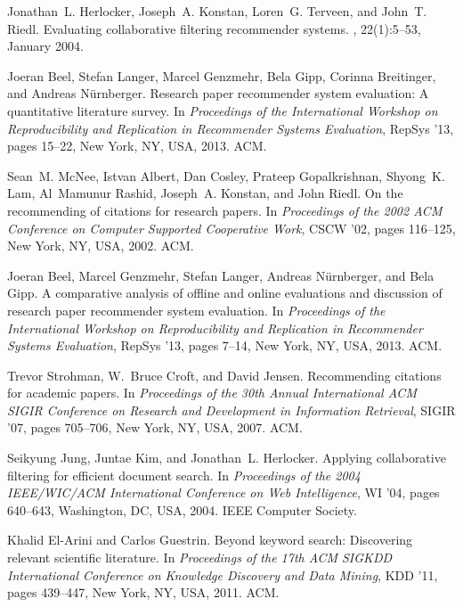 \documentclass[journal]{IEEEtran}
\begin{document}
\begin{thebibliography}{1}
Jonathan~L. Herlocker, Joseph~A. Konstan, Loren~G. Terveen, and John~T. Riedl.
\newblock Evaluating collaborative filtering recommender systems.
, 22(1):5--53, January 2004.

Joeran Beel, Stefan Langer, Marcel Genzmehr, Bela Gipp, Corinna Breitinger, and
  Andreas N\"{u}rnberger.
\newblock Research paper recommender system evaluation: A quantitative
  literature survey.
\newblock In {\em Proceedings of the International Workshop on Reproducibility
  and Replication in Recommender Systems Evaluation}, RepSys '13, pages 15--22,
  New York, NY, USA, 2013. ACM.

Sean~M. McNee, Istvan Albert, Dan Cosley, Prateep Gopalkrishnan, Shyong~K. Lam,
  Al~Mamunur Rashid, Joseph~A. Konstan, and John Riedl.
\newblock On the recommending of citations for research papers.
\newblock In {\em Proceedings of the 2002 ACM Conference on Computer Supported
  Cooperative Work}, CSCW '02, pages 116--125, New York, NY, USA, 2002. ACM.

Joeran Beel, Marcel Genzmehr, Stefan Langer, Andreas N\"{u}rnberger, and Bela
  Gipp.
\newblock A comparative analysis of offline and online evaluations and
  discussion of research paper recommender system evaluation.
\newblock In {\em Proceedings of the International Workshop on Reproducibility
  and Replication in Recommender Systems Evaluation}, RepSys '13, pages 7--14,
  New York, NY, USA, 2013. ACM.

Trevor Strohman, W.~Bruce Croft, and David Jensen.
\newblock Recommending citations for academic papers.
\newblock In {\em Proceedings of the 30th Annual International ACM SIGIR
  Conference on Research and Development in Information Retrieval}, SIGIR '07,
  pages 705--706, New York, NY, USA, 2007. ACM.

Seikyung Jung, Juntae Kim, and Jonathan~L. Herlocker.
\newblock Applying collaborative filtering for efficient document search.
\newblock In {\em Proceedings of the 2004 IEEE/WIC/ACM International Conference
  on Web Intelligence}, WI '04, pages 640--643, Washington, DC, USA, 2004. IEEE
  Computer Society.

Khalid El-Arini and Carlos Guestrin.
\newblock Beyond keyword search: Discovering relevant scientific literature.
\newblock In {\em Proceedings of the 17th ACM SIGKDD International Conference
  on Knowledge Discovery and Data Mining}, KDD '11, pages 439--447, New York,
  NY, USA, 2011. ACM.


\end{thebibliography}
\end{document}
